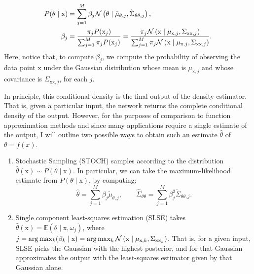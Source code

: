 %
\begin{align}
    \begin{split}
    P(\theta \mid \mathrm{x}) &= \sum_{j=1}^M \beta_j \mathcal{N}\left(\theta \mid \tilde{\mu}_{\theta,j}, \tilde{\Sigma}_{\theta\theta,j} \right), \\
    \beta_j &= \frac{\pi_j P(\mathrm{x}_j)}{\sum_{j=1}^M \pi_j P(\mathrm{x}_j)} = 
    \frac{\pi_j \mathcal{N}\left(\mathrm{x} \mid {\mu}_{\mathrm{x},j}, {\Sigma}_{\mathrm{xx},j} \right)}
    {\sum_{j=1}^M \pi_j \mathcal{N}\left(\mathrm{x} \mid {\mu}_{\mathrm{x},j}, {\Sigma}_{\mathrm{xx},j} \right)}.
    \end{split}
    \label{eq:posterior_distribution}
\end{align}
%
Here, notice that, to compute $\beta_j$, we compute the probability of observing
the data point $\mathrm{x}$ under the Gaussian distribution whose mean is
$\mu_{\mathrm{x},j}$ and whose covariance is $\Sigma_{\mathrm{xx},j}$, for each
$j$.


In principle, this conditional density is the final output of the density
estimator. That is, given a particular input, the network returns the complete
conditional density of the output. However, for the purposes of comparison to
function approximation methods and since many applications require a single
estimate of the output, I will outline two possible ways to obtain such an
estimate $\hat{\theta}$ of $\theta = f(x)$.

\begin{enumerate}
    \item Stochastic Sampling (STOCH) samples according to the distribution
    $\hat{\theta}(\mathrm{x}) \sim P(\theta \mid \mathrm{x})$. In particular, we
    can take the maximum-likelihood estimate from $P(\theta \mid \mathrm{x})$,
    by computing:
    \begin{equation*}
        \hat{\theta} = \sum_{j=1}^M \beta_j \tilde{\mu}_{\theta,j}, \qquad
        \hat{\Sigma}_{\theta\theta} = \sum_{j=1}^M \beta_j^2 \tilde{\Sigma}_{\theta\theta,j}.
    \end{equation*}
    \item Single component least-squares estimation (SLSE) takes
    $\hat{\theta}(\mathrm{x}) = \mathbb{E}\left( \theta \mid \mathrm{x},
    \omega_j \right)$, where $j = \arg \max_k (\beta_k \mid \mathrm{x}) = \arg
    \max_k \mathcal{N}\left(\mathrm{x} \mid \mu_{\mathrm{x},k},
    \Sigma_{\mathrm{xx}_k}\right)$. That is, for a given input, SLSE picks the
    Gaussian with the highest posterior, and for that Gaussian approximates the
    output with the least-squares estimator given by that Gaussian alone.
\end{enumerate}



